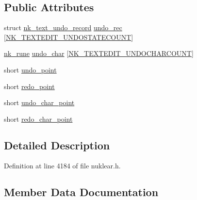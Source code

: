 \subsection*{Public Attributes}
\begin{DoxyCompactItemize}
\item 
struct \mbox{\hyperlink{structnk__text__undo__record}{nk\+\_\+text\+\_\+undo\+\_\+record}} \mbox{\hyperlink{structnk__text__undo__state_ad8d4523c523f3f1a90fcc709f4db8756}{undo\+\_\+rec}} \mbox{[}\mbox{\hyperlink{nuklear_8h_a473dfa38f3ce823a5368c892ab7b13fc}{N\+K\+\_\+\+T\+E\+X\+T\+E\+D\+I\+T\+\_\+\+U\+N\+D\+O\+S\+T\+A\+T\+E\+C\+O\+U\+NT}}\mbox{]}
\item 
\mbox{\hyperlink{nuklear_8h_a7261077b5093b020a11ec7a06e0aa762}{nk\+\_\+rune}} \mbox{\hyperlink{structnk__text__undo__state_a1e9a3b0a6cb7a1e2aee05c2de2ab618d}{undo\+\_\+char}} \mbox{[}\mbox{\hyperlink{nuklear_8h_a34eae5515d7d360bb243d6928f323cb6}{N\+K\+\_\+\+T\+E\+X\+T\+E\+D\+I\+T\+\_\+\+U\+N\+D\+O\+C\+H\+A\+R\+C\+O\+U\+NT}}\mbox{]}
\item 
short \mbox{\hyperlink{structnk__text__undo__state_acad719143b81dc7d2463c1d06f03c672}{undo\+\_\+point}}
\item 
short \mbox{\hyperlink{structnk__text__undo__state_ab5cd02ca0246a81627790e3eb20773e1}{redo\+\_\+point}}
\item 
short \mbox{\hyperlink{structnk__text__undo__state_a2c98283f50f5ef3da53acee6b0b4f85d}{undo\+\_\+char\+\_\+point}}
\item 
short \mbox{\hyperlink{structnk__text__undo__state_ad1067474fa6efe12ad27a6b765b15c44}{redo\+\_\+char\+\_\+point}}
\end{DoxyCompactItemize}


\subsection{Detailed Description}


Definition at line 4184 of file nuklear.\+h.



\subsection{Member Data Documentation}
\mbox{\label{structnk__text__undo__state_ad1067474fa6efe12ad27a6b765b15c44}} 

